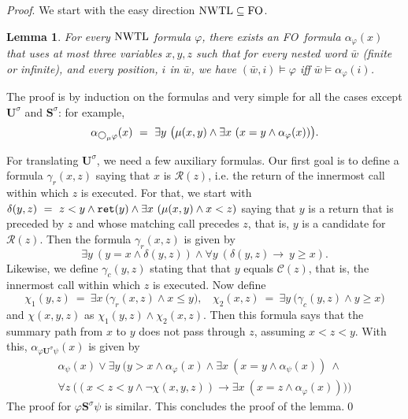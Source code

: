 \documentclass{LMCS}
\newcommand{\M}{{\mu}}
\newcommand{\w}{{\bar{w}}}
\newcommand{\dm}{\Diamond}
\newcommand{\aProof}[2]{\vspace{2mm}{\noindent\em Proof of
#1.~}#2\qed}
\newcommand{\C}{{\mathcal{C}}}
\newcommand{\R}{{\mathcal{R}}}
\newcommand{\U}{{\mathbf U}}
\renewcommand{\S}{{\mathbf S}}
\newcommand{\next}{\text{\raisebox{1pt}{$\bigcirc$}}}
\newcommand{\FO}{{\rm FO}}
\renewcommand{\phi}{\varphi}
\theoremstyle{plain}
\newtheorem{lemma}[theorem]{Lemma}
\theoremstyle{definition}
\newcommand{\ppath}{\sigma} \newcommand{\Ul}{\U}
\newcommand{\Up}{\U^\ppath}
\newcommand{\Sp}{\S^\ppath}
\newcommand{\retr}{\mathit{ret}}
\newcommand{\rett}{{\tt ret}}
\renewcommand{\retr}{\rett}
\newcommand{\dmm}{\dm_{\M}}
\renewcommand{\dm}{\next}
\renewcommand{\dmm}{\dm_\M}
\newcounter{example}
\begin{document}
\medskip
\noindent
{\em Proof}.
 We start with the easy direction $\nwtl\subseteq \FO$.

\begin{lemma}
\label{nwtl-to-fo-lemma}
For every $\text{\rm NWTL}$ formula $\phi$, there exists an \FO\ formula
$\alpha_\phi(x)$ that uses at most three variables $x,y,z$ such that
for every nested word $\w$ (finite or infinite), and every position,
$i$ in $\w$, we have
$(\w,i)\models\phi$ iff $\w\models\alpha_\phi(i)$.
\end{lemma}

\aProof{Lemma \ref{nwtl-to-fo-lemma}}{The proof is by induction
on the formulas and very simple for all the cases except $\Up$ and
$\Sp$: for example,
$$\alpha_{\dmm\phi}(x) \ =\ \exists y\ \big(\M(x,y) \wedge \exists
x\ (x=y \wedge \alpha_\phi(x))\big).$$ 

For translating $\Up$, we need a few auxiliary formulas. Our first
goal is to define a formula $\gamma_r(x,z)$ saying that $x$ is
$\R(z)$, i.e. the return of the innermost call within which $z$ is
executed. For that, we start with 
$\delta(y,z) \ = \ z<y\wedge\retr(y)\wedge \exists x\
(\M(x,y) \wedge x < z )$ saying that $y$ is a return that
is preceded by $z$ and whose matching call precedes $z$, 
that is, $y$ is a
candidate for $\R(z)$. Then the formula $\gamma_r(x,z)$ is given by
$$\exists y\ (y = x \wedge \delta(y,z)) \wedge 
\forall y\ (\delta(y,z) \to\ y \geq x).$$
Likewise, we define $\gamma_c(y,z)$ stating that that $y$ equals
$\C(z)$, that is, the innermost call within which $z$ is executed. 
Now define 
$$\chi_1(y,z) \ = \ \exists x\ \big(\gamma_r(x,z) \wedge x
\leq y\big), \ \ \ \  \chi_2(x,z) \ = \ \exists y\ \big(\gamma_c(y,z)
\wedge y \geq x\big)$$ 
and $\chi(x,y,z)$ as $\chi_1(y,z) \wedge \chi_2(x,z)$. Then this
formula says that the summary path from $x$ to $y$ does not pass
through $z$, assuming $x < z < y$. With this,
$\alpha_{\phi\Up\psi}(x)$ is given by
\begin{multline*}
\alpha_\psi(x) \vee \exists y\ 
\bigg(y > x \wedge \alpha_\varphi(x) \wedge \exists x\ (x=y
\wedge \alpha_\psi(x)) \ \wedge\\
\forall z\ \big((x < z < y \wedge \neg\chi(x,y,z)) \to
\exists x\ (x=z \wedge \alpha_\phi(x))\big)\bigg)
\end{multline*}
The proof for $\phi\Sp\psi$ is similar. This concludes
 the proof of
the lemma.}
\end{document}
